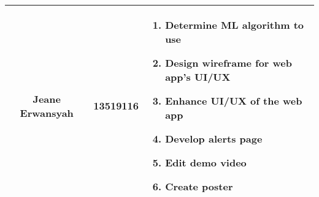 \begin{table*}[htbp]
\begin{center}
\begin{tabular}{|c|c|p{10cm}|}
			\hline
			Jeane Erwansyah  & 13519116            & \begin{enumerate}[leftmargin=*]
				                                         \item Determine ML algorithm to use
				                                         \item Design wireframe for web app's UI/UX
				                                         \item Enhance UI/UX of the web app
				                                         \item Develop alerts page
				                                         \item Edit demo video
				                                         \item Create poster
			                                         \end{enumerate}
			\\
			\hline
		\end{tabular}
	\end{center}
	\label{tab-distribution-of-task}
\end{table*}